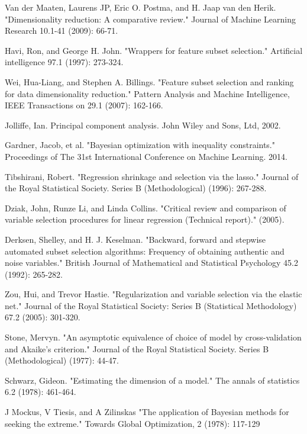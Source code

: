 \documentclass[a4paper,onecolumn]{article}
\theoremstyle{remark}
\begin{document}
\begin{thebibliography}{9}
Van der Maaten, Laurens JP, Eric O. Postma, and H. Jaap van den Herik. 
"Dimensionality reduction: A comparative review." 
Journal of Machine Learning Research 10.1-41 (2009): 66-71.

Havi, Ron, and George H. John. 
"Wrappers for feature subset selection."
Artificial intelligence 97.1 (1997): 273-324.

Wei, Hua-Liang, and Stephen A. Billings. 
"Feature subset selection and ranking for data dimensionality reduction." 
Pattern Analysis and Machine Intelligence, IEEE Transactions on 29.1 (2007): 162-166.

Jolliffe, Ian. Principal component analysis. John Wiley and Sons, Ltd, 2002.

Gardner, Jacob, et al. 
"Bayesian optimization with inequality constraints."
Proceedings of The 31st International Conference on Machine Learning. 2014.

Tibshirani, Robert. 
"Regression shrinkage and selection via the lasso." 
Journal of the Royal Statistical Society. Series B (Methodological) (1996): 267-288.

Dziak, John, Runze Li, and Linda Collins. 
"Critical review and comparison of variable selection procedures for linear regression (Technical report)." (2005).

Derksen, Shelley, and H. J. Keselman. 
"Backward, forward and stepwise automated subset selection algorithms: Frequency of obtaining authentic and noise variables." 
British Journal of Mathematical and Statistical Psychology 45.2 (1992): 265-282.

Zou, Hui, and Trevor Hastie. 
"Regularization and variable selection via the elastic net." 
Journal of the Royal Statistical Society: Series B (Statistical Methodology) 67.2 (2005): 301-320.

Stone, Mervyn. 
"An asymptotic equivalence of choice of model by cross-validation and Akaike's criterion." 
Journal of the Royal Statistical Society. Series B (Methodological) (1977): 44-47.

Schwarz, Gideon. 
"Estimating the dimension of a model." 
The annals of statistics 6.2 (1978): 461-464.

J Mockus, V Tiesis, and A Zilinskas
"The application of Bayesian methods for seeking the extreme."
Towards Global Optimization, 2 (1978): 117-129


\end{thebibliography}
\end{document}
